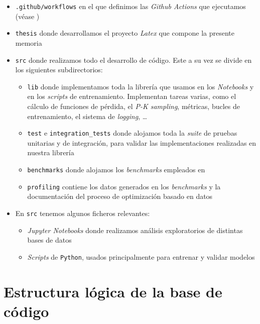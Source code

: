 \begin{itemize}
    \item \lstinline{.github/workflows} en el que definimos las \textit{Github Actions} que ejecutamos (véase )
    \item \lstinline{thesis} donde desarrollamos el proyecto \textit{Latex} que compone la presente memoria
    \item \lstinline{src} donde realizamos todo el desarrollo de código. Este a su vez se divide en los siguientes subdirectorios:
        \begin{itemize}
            \item \lstinline{lib} donde implementamos toda la librería que usamos en los \textit{Notebooks} y en los \textit{scripts} de entrenamiento. Implementan tareas varias, como el cálculo de funciones de pérdida, el \textit{P-K sampling}, métricas, bucles de entrenamiento, el sistema de \textit{logging}, \ldots
            \item \lstinline{test} e \lstinline{integration_tests} donde alojamos toda la \textit{suite} de pruebas unitarias y de integración, para validar las implementaciones realizadas en nuestra librería
            \item \lstinline{benchmarks} donde alojamos los \textit{benchmarks} empleados en 
            \item \lstinline{profiling} contiene los datos generados en los \textit{benchmarks} y la documentación del proceso de optimización basado en datos
        \end{itemize}
    \item En \lstinline{src} tenemos algunos ficheros relevantes:

        \begin{itemize}
            \item \textit{Jupyter Notebooks} donde realizamos análisis exploratorios de distintas bases de datos
            \item \textit{Scripts} de \lstinline{Python}, usados principalmente para entrenar y validar modelos
        \end{itemize}\end{itemize}

\section{Estructura lógica de la base de código} \label{isec:estructura_paquetes_modulos}

